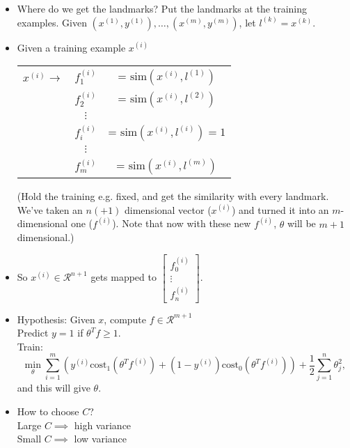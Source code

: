\documentclass[10pt]{article}
\begin{document}
\begin{itemize}
  \item Where do we get the landmarks? Put the landmarks at the training examples. Given $(x^{(1)},y^{(1)}), \dots, (x^{(m)},y^{(m)})$, let $l^{(k)}=x^{(k)}$.
  \item Given a training example $x^{(i)}$ \\
    \begin{center}
      \begin{tabular}{c c c}
        $x^{(i)}\rightarrow$ & $f_1^{(i)}$ &= $\text{sim}(x^{(i)},l^{(1)})$ \\
                             & $f_2^{(i)}$ &= $\text{sim}(x^{(i)},l^{(2)})$ \\
        &$\vdots$ & \\
                             & $f_i^{(i)}$ &= $\text{sim}(x^{(i)},l^{(i)})=1$ \\
        &$\vdots$ & \\
                             & $f_m^{(i)}$ &= $\text{sim}(x^{(i)},l^{(m)})$ \\
      \end{tabular}
    \end{center}
    (Hold the training e.g. fixed, and get the similarity with every landmark. We've taken an $n(+1)$ dimensional vector ($x^{(i)}$) and turned it into an $m$-dimensional one ($f^{(i)}$). Note that now with these new $f^{(i)}$, $\theta$ will be $m+1$ dimensional.)
  \item So $x^{(i)} \in \mathcal{R}^{n+1}$ gets mapped to $\begin{bmatrix} f_0^{(i)} \\ \vdots \\ f_n^{(i)}\end{bmatrix}$.
  \item Hypothesis: Given $x$, compute $f \in \mathcal{R}^{m+1}$ \\
    Predict $y=1$ if $\theta^T f \geq 1$. \\
    Train:
    \begin{equation*}
      \min_{\theta} \sum_{i=1}^m \left( y^{(i)} \text{cost}_1(\theta^T f^{(i)}) + (1-y^{(i)}) \text{cost}_0 (\theta^T f^{(i)} )\right) + \frac{1}{2}\sum_{j=1}^n \theta_j^2,
    \end{equation*}
    and this will give $\theta$.
  \item How to choose $C$? \\
    Large $C \implies$ high variance \\
    Small $C \implies$ low variance \\

\end{itemize}
\end{document}
